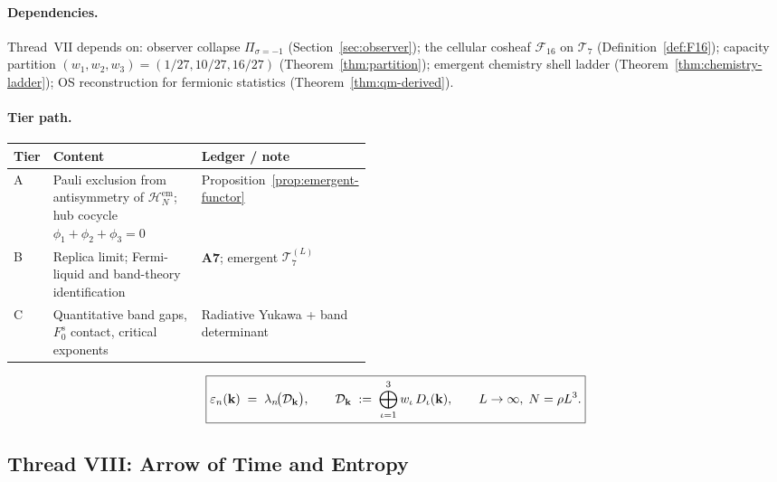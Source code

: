 \paragraph{Dependencies.}
Thread~VII depends on:
observer collapse $\Pi_{\sigma=-1}$ (Section~\ref{sec:observer});
the cellular cosheaf $\mathcal{F}_{16}$ on $\mathcal{T}_7$
(Definition~\ref{def:F16});
capacity partition $(w_1,w_2,w_3)=(1/27,10/27,16/27)$
(Theorem~\ref{thm:partition});
emergent chemistry shell ladder (Theorem~\ref{thm:chemistry-ladder});
OS reconstruction for fermionic statistics (Theorem~\ref{thm:qm-derived}).

\paragraph{Tier path.}
\begin{center}
\small
\renewcommand{\arraystretch}{1.1}
\begin{tabular}{@{}llp{0.46\linewidth}@{}}
\toprule
\textbf{Tier} & \textbf{Content} & \textbf{Ledger / note} \\
\midrule
A &
  Pauli exclusion from antisymmetry of $\mathcal{H}_N^{\mathrm{em}}$;
  hub cocycle $\phi_1+\phi_2+\phi_3=0$ &
  Proposition~\ref{prop:emergent-functor} \\
B &
  Replica limit; Fermi-liquid and band-theory identification &
  \textbf{A7}; emergent $\mathcal{T}_7^{(L)}$ \\
C &
  Quantitative band gaps, $F_0^s$ contact, critical exponents &
  Radiative Yukawa + band determinant \\
\bottomrule
\end{tabular}
\end{center}

\begin{equation}\label{eq:thread-7-box}
  \boxed{%
  \varepsilon_n(\mathbf{k})
  \;=\;
  \lambda_n\!\bigl(\mathcal{D}_{\mathbf{k}}\bigr),
  \qquad
  \mathcal{D}_{\mathbf{k}}
  \;:=\;
  \bigoplus_{\iota=1}^3 w_\iota\,D_\iota(\mathbf{k}),
  \qquad
  L\to\infty,\;
  N=\rho L^3.}
\end{equation}

\subsection{Thread VIII: Arrow of Time and Entropy}
\label{sec:thread-8}

